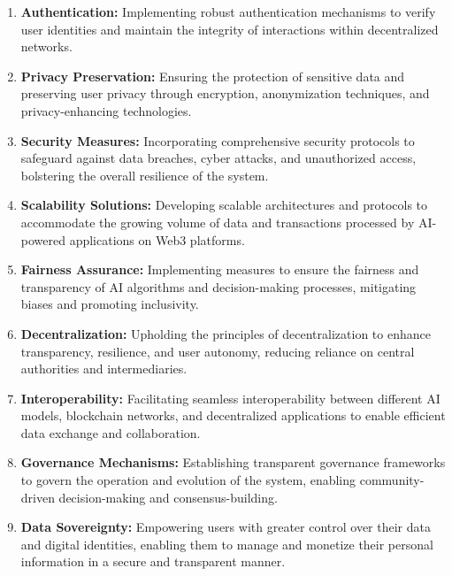 \documentclass[conference]{IEEEtran}
\begin{document}
\begin{enumerate}

    \item \textbf{Authentication:} Implementing robust authentication mechanisms to verify user identities and maintain the integrity of interactions within decentralized networks.

    \item \textbf{Privacy Preservation:} Ensuring the protection of sensitive data and preserving user privacy through encryption, anonymization techniques, and privacy-enhancing technologies.

    \item \textbf{Security Measures:} Incorporating comprehensive security protocols to safeguard against data breaches, cyber attacks, and unauthorized access, bolstering the overall resilience of the system.

    \item \textbf{Scalability Solutions:} Developing scalable architectures and protocols to accommodate the growing volume of data and transactions processed by AI-powered applications on Web3 platforms.

    \item \textbf{Fairness Assurance:} Implementing measures to ensure the fairness and transparency of AI algorithms and decision-making processes, mitigating biases and promoting inclusivity.

    \item \textbf{Decentralization:} Upholding the principles of decentralization to enhance transparency, resilience, and user autonomy, reducing reliance on central authorities and intermediaries.

    \item \textbf{Interoperability:} Facilitating seamless interoperability between different AI models, blockchain networks, and decentralized applications to enable efficient data exchange and collaboration.

    \item \textbf{Governance Mechanisms:} Establishing transparent governance frameworks to govern the operation and evolution of the system, enabling community-driven decision-making and consensus-building.

    \item \textbf{Data Sovereignty:} Empowering users with greater control over their data and digital identities, enabling them to manage and monetize their personal information in a secure and transparent manner.


\end{enumerate}
\end{document}
